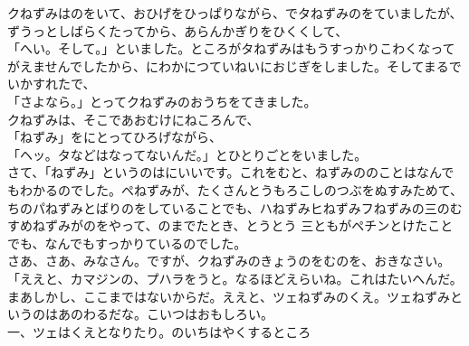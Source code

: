 \documentclass[
    a4paper,
    10pt,
    book]
    {tarticle}
\begin{document}
\indent クねずみはのをいて、おひげをひっぱりながら、でタねずみのをていましたが、ずうっとしばらくたってから、あらんかぎりをひくくして、\\
「へい。そして。」といました。ところがタねずみはもうすっかりこわくなってがえませんでしたから、にわかにつていねいにおじぎをしました。そしてまるでいかすれたで、\\
「さよなら。」とってクねずみのおうちをてきました。\\
\indent クねずみは、そこであおむけにねころんで、\\
「ねずみ」をにとってひろげながら、\\
「ヘッ。タなどはなってないんだ。」とひとりごとをいました。\\
\indent さて、「ねずみ」というのはにいいです。これをむと、ねずみののことはなんでもわかるのでした。ペねずみが、たくさんとうもろこしのつぶをぬすみためて、ちのパねずみとばりのをしていることでも、ハねずみヒねずみフねずみの三のむすめねずみがのをやって、のまでたとき、とうとう
三ともがペチンとけたことでも、なんでもすっかりているのでした。\\
\indent さあ、さあ、みなさん。ですが、クねずみのきょうのをむのを、おきなさい。\\
「ええと、カマジンの、プハラをうと。なるほどえらいね。これはたいへんだ。まあしかし、ここまではないからだ。ええと、ツェねずみのくえ。ツェねずみというのはあのわるだな。こいつはおもしろい。\\
\indent {}一、ツェはくえとなりたり。のいちはやくするところ
\end{document}
